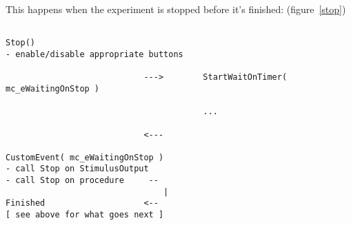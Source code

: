 \documentclass[a4paper,12pt]{article}
\begin{document}
\begin{landscape}
This happens when the experiment is stopped before it's finished: (figure~\ref{stop})

\begin{verbatim}

Stop()
- enable/disable appropriate buttons

                            --->        StartWaitOnTimer( mc_eWaitingOnStop )

                                        ...

                            <---

CustomEvent( mc_eWaitingOnStop )
- call Stop on StimulusOutput
- call Stop on procedure     --
                                |
Finished                    <--
[ see above for what goes next ]

\end{verbatim}
\end{landscape}



% 
%
\end{document}
